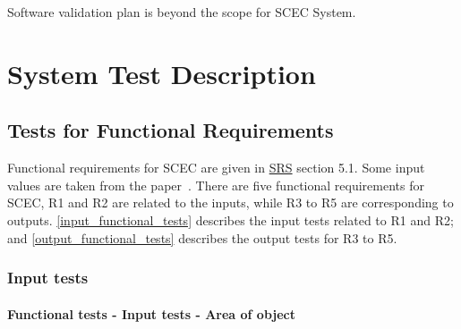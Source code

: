 \documentclass[12pt, titlepage]{article}
\begin{document}
Software validation plan is beyond the scope for SCEC System.

\section{System Test Description}
\label{systemtests}
	
\subsection{Tests for Functional Requirements}

Functional requirements for SCEC are given in \href{https://github.com/DeeshaPatel/CAS-741-Solar-Cooker/blob/7c53c8d9a19ca2f94dfba6ba9208eae0bf03b8cc/docs/SRS/SRS.pdf}{SRS} section 5.1. Some input values are taken from the paper~\cite{MathsModel}. There are five functional requirements for SCEC, R1 and R2 are related to the inputs, while R3 to R5 are corresponding to outputs. \autoref{input_functional_tests} describes the input tests related to R1 and R2; and \autoref{output_functional_tests} describes the output tests for R3 to R5.        

\subsubsection{Input tests}
\label{input_functional_tests}

\paragraph{Functional tests - Input tests - Area of object}
\end{document}
